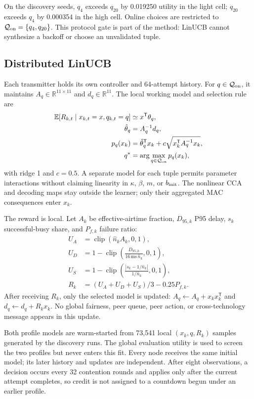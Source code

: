 On the discovery seeds, $q_4$ exceeds $q_{20}$
by 0.019250 utility in the light cell; $q_{20}$ exceeds $q_4$ by 0.000354 in
the high cell. Online choices are restricted to
$\mathcal Q_{\rm on}=\{q_4,q_{20}\}$. This protocol gate is part of the
method: LinUCB cannot synthesize a backoff or choose an unvalidated tuple.

\subsection{Distributed LinUCB}

Each transmitter holds its own controller and 64-attempt history. For
$q\in\mathcal Q_{\rm on}$, it maintains
$A_q\in\mathbb R^{11\times11}$ and $d_q\in\mathbb R^{11}$. The local
working model and selection rule are
\begin{align}
\mathbb E[R_{k,t}\mid x_{k,t}=x,q_{k,t}=q]&\simeq x^{\mathsf T}\theta_q,
\label{eq:linear-reward}\\
\hat\theta_q&=A_q^{-1}d_q,\nonumber\\
p_q(x_k)&=\hat\theta_q^{\mathsf T}x_k+
c\sqrt{x_k^{\mathsf T}A_q^{-1}x_k},\nonumber\\
q^*&=\arg\max_{q\in\mathcal Q_{\rm on}}p_q(x_k),
\label{eq:linucb}
\end{align}
with ridge 1 and $c=0.5$. A separate model for each tuple permits parameter
interactions without claiming linearity in $\kappa$, $\beta$, $m$, or
$b_{\rm init}$. The nonlinear CCA and decoding maps stay outside the learner;
only their aggregated MAC consequences enter $x_k$.

The reward is local. Let $A_k$ be effective-airtime fraction, $D_{95,k}$ P95
delay, $s_k$ successful-busy share, and $P_{f,k}$ failure ratio:
\begin{align}
U_A&=\operatorname{clip}(\hat n_kA_k,0,1),\nonumber\\
U_D&=1-\operatorname{clip}
 \left(\frac{D_{95,k}}{16\,\mathrm{ms}\,\hat n_k},0,1\right),\nonumber\\
U_S&=1-\operatorname{clip}
 \left(\frac{|s_k-1/\hat n_k|}{1/\hat n_k},0,1\right),\nonumber\\
R_k&=(U_A+U_D+U_S)/3-0.25P_{f,k}.
\label{eq:reward}
\end{align}
After receiving $R_k$, only the selected model is updated:
$A_q\leftarrow A_q+x_kx_k^{\mathsf T}$ and
$d_q\leftarrow d_q+R_kx_k$. No global fairness, peer queue, peer action, or
cross-technology message appears in this update.

Both profile models are warm-started from 73,541 local
$(x_k,q,R_k)$ samples generated by the discovery runs. The global evaluation
utility is used to screen the two profiles but never enters this fit. Every
node receives the same initial model; its later history and updates are
independent. After eight observations, a decision occurs every 32 contention
rounds and applies only after the current attempt completes, so credit is not
assigned to a countdown begun under an earlier profile.
